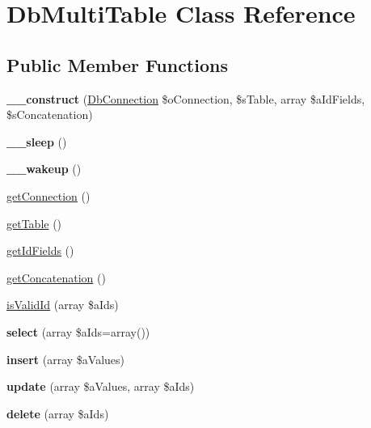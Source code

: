 \hypertarget{class_db_multi_table}{\section{Db\-Multi\-Table Class Reference}
\label{class_db_multi_table}
}
\subsection*{Public Member Functions}
\begin{DoxyCompactItemize}
\item 
\hypertarget{class_db_multi_table_a4167f1c8c738bad8d47362ae16cae653}{{\bfseries \-\_\-\-\_\-construct} (\hyperlink{class_db_connection}{Db\-Connection} \$o\-Connection, \$s\-Table, array \$a\-Id\-Fields, \$s\-Concatenation)}\label{class_db_multi_table_a4167f1c8c738bad8d47362ae16cae653}

\item 
\hypertarget{class_db_multi_table_a29fef477cc57c09cc6590e7990bf2413}{{\bfseries \-\_\-\-\_\-sleep} ()}\label{class_db_multi_table_a29fef477cc57c09cc6590e7990bf2413}

\item 
\hypertarget{class_db_multi_table_a087ba5bc48843b12f16fb61fb2e02c07}{{\bfseries \-\_\-\-\_\-wakeup} ()}\label{class_db_multi_table_a087ba5bc48843b12f16fb61fb2e02c07}

\item 
\hyperlink{class_db_multi_table_a03eb573ad50f1efe1605fb6d38ea8c5f}{get\-Connection} ()
\item 
\hyperlink{class_db_multi_table_ab2315d078fcfbc53238517f49754e919}{get\-Table} ()
\item 
\hyperlink{class_db_multi_table_af84a3c49cb55982e2009e4b88bdc8d60}{get\-Id\-Fields} ()
\item 
\hyperlink{class_db_multi_table_a50091e38487d82c2b79bb45150cbc877}{get\-Concatenation} ()
\item 
\hyperlink{class_db_multi_table_a6b22f33590dd9ffd5e71b2420067a44c}{is\-Valid\-Id} (array \$a\-Ids)
\item 
\hypertarget{class_db_multi_table_a4f5cbfecfc11b9a87d0850994e42f356}{{\bfseries select} (array \$a\-Ids=array())}\label{class_db_multi_table_a4f5cbfecfc11b9a87d0850994e42f356}

\item 
\hypertarget{class_db_multi_table_a51183054b9b8ab246bbdc653bd415aee}{{\bfseries insert} (array \$a\-Values)}\label{class_db_multi_table_a51183054b9b8ab246bbdc653bd415aee}

\item 
\hypertarget{class_db_multi_table_a47796e7910bbdd8a19c5eb76309344cf}{{\bfseries update} (array \$a\-Values, array \$a\-Ids)}\label{class_db_multi_table_a47796e7910bbdd8a19c5eb76309344cf}

\item 
\hypertarget{class_db_multi_table_ad61946bc4775e6093c5a12d7e065f1ff}{{\bfseries delete} (array \$a\-Ids)}\label{class_db_multi_table_ad61946bc4775e6093c5a12d7e065f1ff}

\end{DoxyCompactItemize}


